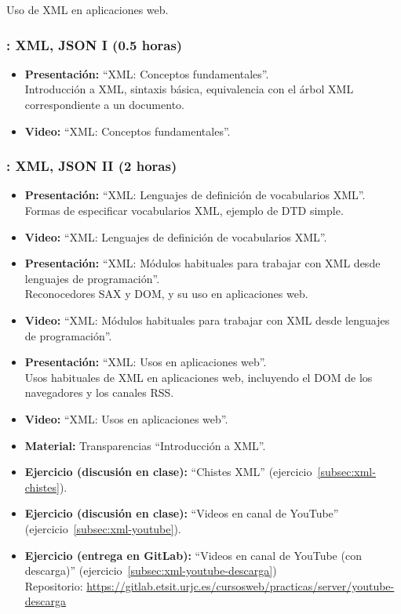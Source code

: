 \documentclass[a4paper,12pt]{article}
\begin{document}
Uso de XML en aplicaciones web.

\subsubsection{\juevesI: XML, JSON I (0.5 horas)}
\label{cal:juevesIb}

\begin{itemize}
\item \textbf{Presentación:} ``XML: Conceptos fundamentales''. \\
  Introducción a XML, sintaxis básica, equivalencia con el árbol XML correspondiente a un documento.
\item \textbf{Video:} ``XML: Conceptos fundamentales''.
\end{itemize}

\subsubsection{\juevesJ: XML, JSON II (2 horas)}
\label{cal:juevesJ}

\begin{itemize}
\item \textbf{Presentación:} ``XML: Lenguajes de definición de vocabularios XML''. \\
  Formas de especificar vocabularios XML, ejemplo de DTD simple.
\item \textbf{Video:} ``XML: Lenguajes de definición de vocabularios XML''.
\item \textbf{Presentación:} ``XML: Módulos habituales para trabajar con XML desde lenguajes de programación''. \\
  Reconocedores SAX y DOM, y su uso en aplicaciones web.
\item \textbf{Video:} ``XML: Módulos habituales para trabajar con XML desde lenguajes de programación''.
\item \textbf{Presentación:} ``XML: Usos en aplicaciones web''. \\
  Usos habituales de XML en aplicaciones web, incluyendo el DOM de los navegadores y los canales RSS.
\item \textbf{Video:} ``XML: Usos en aplicaciones web''.
\item \textbf{Material:} Transparencias ``Introducción a XML''.
\item \textbf{Ejercicio (discusión en clase):} ``Chistes XML'' (ejercicio~\ref{subsec:xml-chistes}).
\item \textbf{Ejercicio (discusión en clase):} ``Videos en canal de YouTube'' (ejercicio~\ref{subsec:xml-youtube}).
\item \textbf{Ejercicio (entrega en GitLab):} ``Videos en canal de YouTube (con descarga)'' (ejercicio~\ref{subsec:xml-youtube-descarga}) \\
  Repositorio: \url{https://gitlab.etsit.urjc.es/cursosweb/practicas/server/youtube-descarga}
\end{itemize}
\end{document}
